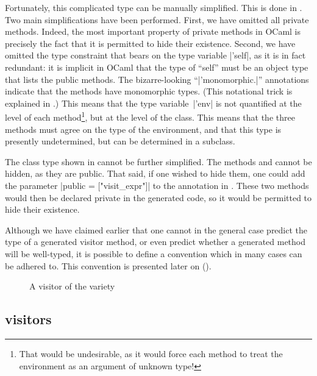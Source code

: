 \documentclass[11pt,a4paper,twoside]{article}
\begin{document}
Fortunately, this complicated type can be manually simplified. This is done in
. Two main simplifications have been performed. First, we
have omitted all private methods. Indeed, the most important property of
private methods in OCaml is precisely the fact that it is permitted to hide
their existence. Second, we have omitted the type constraint that bears on
the type variable \oc|'self|, as it is in fact redundant: it is implicit in OCaml
that the type of ``self'' must be an object type that lists the public methods.
The bizarre-looking ``\oc|'monomorphic.|'' annotations indicate that the methods have
monomorphic types. (This notational trick is explained in .)
This means that the type variable~\oc|'env| is not quantified at the level of each
method\footnote{That would be undesirable, as it would force each method to
treat the environment as an argument of unknown type!}, but at the level of the class.
This means that the three methods must agree on the type of the environment, and
that this type is presently undetermined, but can be determined in a subclass.

The class type shown in  cannot be further simplified.
The methods  and  cannot be hidden, as
they are public. That said, if one wished to hide them, one could add the parameter %
\oc|public = ["visit_expr"]| to the annotation \derivingvisitors in .
These two methods would then be declared private in the generated code,
so it would be permitted to hide their existence.

Although we have claimed earlier that one cannot in the general case predict
the type of a generated visitor method, or even predict whether a generated
method will be well-typed, it is possible to define a convention which in many
cases can be adhered to. This convention is presented later on
().


\begin{figure}[t]
\vspace{-\baselineskip}
\caption{A visitor of the \map variety}
\label{fig:expr01}
\end{figure}

\subsection{\map visitors}
\label{sec:intro:map}
\end{document}
